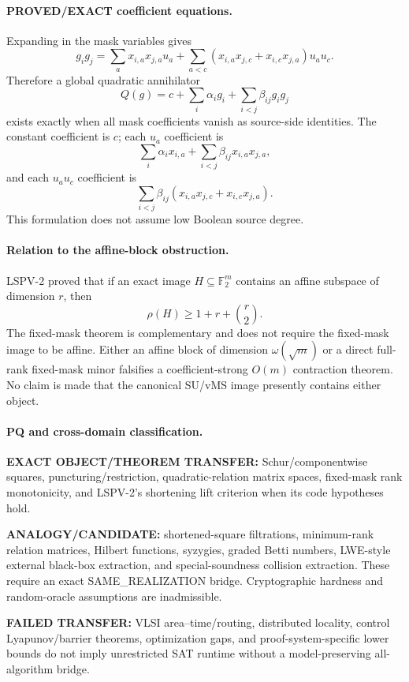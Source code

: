 \documentclass[11pt]{article}
\begin{document}
\paragraph{PROVED/EXACT coefficient equations.}
Expanding in the mask variables gives
\[
g_i g_j=\sum_a x_{i,a}x_{j,a}u_a+
\sum_{a<c}(x_{i,a}x_{j,c}+x_{i,c}x_{j,a})u_au_c.
\]
Therefore a global quadratic annihilator
\[
Q(g)=c+\sum_i\alpha_i g_i+\sum_{i<j}\beta_{ij}g_i g_j
\]
exists exactly when all mask coefficients vanish as source-side identities. The constant coefficient is $c$; each $u_a$ coefficient is
\[
\sum_i\alpha_i x_{i,a}+\sum_{i<j}\beta_{ij}x_{i,a}x_{j,a},
\]
and each $u_au_c$ coefficient is
\[
\sum_{i<j}\beta_{ij}(x_{i,a}x_{j,c}+x_{i,c}x_{j,a}).
\]
This formulation does not assume low Boolean source degree.

\paragraph{Relation to the affine-block obstruction.}
LSPV-2 proved that if an exact image $H\subseteq\mathbb F_2^m$ contains an affine subspace of dimension $r$, then
\[
\rho(H)\ge1+r+\binom r2.
\]
The fixed-mask theorem is complementary and does not require the fixed-mask image to be affine. Either an affine block of dimension $\omega(\sqrt m)$ or a direct full-rank fixed-mask minor falsifies a coefficient-strong $O(m)$ contraction theorem. No claim is made that the canonical SU/vMS image presently contains either object.

\paragraph{PQ and cross-domain classification.}
\textbf{EXACT OBJECT/THEOREM TRANSFER:} Schur/componentwise squares, puncturing/restriction, quadratic-relation matrix spaces, fixed-mask rank monotonicity, and LSPV-2's shortening lift criterion when its code hypotheses hold.

\textbf{ANALOGY/CANDIDATE:} shortened-square filtrations, minimum-rank relation matrices, Hilbert functions, syzygies, graded Betti numbers, LWE-style external black-box extraction, and special-soundness collision extraction. These require an exact SAME\_REALIZATION bridge. Cryptographic hardness and random-oracle assumptions are inadmissible.

\textbf{FAILED TRANSFER:} VLSI area--time/routing, distributed locality, control Lyapunov/barrier theorems, optimization gaps, and proof-system-specific lower bounds do not imply unrestricted SAT runtime without a model-preserving all-algorithm bridge.
\end{document}
